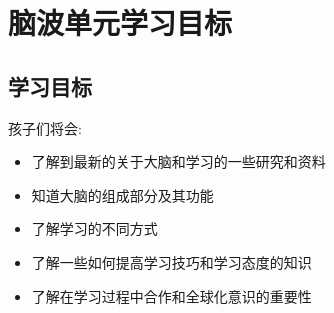 \chapter{脑波单元学习目标}
\section{学习目标}
    孩子们将会:
    \begin{itemize}
       \item 了解到最新的关于大脑和学习的一些研究和资料 
        \item 知道大脑的组成部分及其功能
        \item 了解学习的不同方式  
        \item 了解一些如何提高学习技巧和学习态度的知识
        \item 了解在学习过程中合作和全球化意识的重要性
    \end{itemize}  
